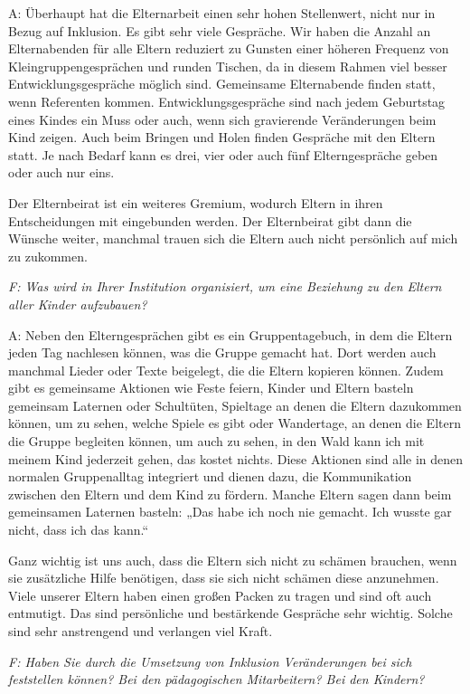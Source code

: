 \begin{linenumbers*}
A: Überhaupt hat die Elternarbeit einen sehr hohen Stellenwert, nicht nur in Bezug auf Inklusion. Es gibt sehr viele Gespräche. Wir haben die Anzahl an Elternabenden für alle Eltern reduziert zu Gunsten einer höheren Frequenz von Kleingruppengesprächen und runden Tischen, da in diesem Rahmen viel besser Entwicklungsgespräche möglich sind. Gemeinsame Elternabende finden statt, wenn Referenten kommen.
Entwicklungsgespräche sind nach jedem Geburtstag eines Kindes ein Muss oder auch, wenn sich gravierende Veränderungen beim Kind zeigen. Auch beim Bringen und Holen finden Gespräche mit den Eltern statt. Je nach Bedarf kann es drei, vier oder auch fünf Elterngespräche geben oder auch nur eins. 

Der Elternbeirat ist ein weiteres Gremium, wodurch Eltern in ihren Entscheidungen mit eingebunden werden. Der Elternbeirat gibt dann die Wünsche weiter, manchmal trauen sich die Eltern auch nicht persönlich auf mich zu zukommen. 

\emph{F: Was wird in Ihrer Institution organisiert, um eine Beziehung zu den Eltern aller Kinder aufzubauen?}

A: Neben den Elterngesprächen gibt es ein Gruppentagebuch, in dem die Eltern jeden Tag nachlesen können, was die Gruppe gemacht hat. Dort werden auch manchmal Lieder oder Texte beigelegt, die die Eltern kopieren können. Zudem gibt es gemeinsame Aktionen wie Feste feiern, Kinder und Eltern basteln gemeinsam Laternen oder Schultüten, Spieltage an denen die Eltern dazukommen können, um zu sehen, welche Spiele es gibt oder Wandertage, an denen die Eltern die Gruppe begleiten können, um auch zu sehen, in den Wald kann ich mit meinem Kind jederzeit gehen, das kostet nichts. Diese Aktionen sind alle in denen normalen Gruppenalltag integriert und dienen dazu, die Kommunikation zwischen den Eltern und dem Kind zu fördern. Manche Eltern sagen dann beim gemeinsamen Laternen basteln: „Das habe ich noch nie gemacht. Ich wusste gar nicht, dass ich das kann.“ 

Ganz wichtig ist uns auch, dass die Eltern sich nicht zu schämen brauchen, wenn sie zusätzliche Hilfe benötigen, dass sie sich nicht schämen diese anzunehmen. Viele unserer Eltern haben einen großen Packen zu tragen und sind oft auch entmutigt. Das sind persönliche und bestärkende Gespräche sehr wichtig. Solche sind sehr anstrengend und verlangen viel Kraft. 

\emph{F: Haben Sie durch die Umsetzung von Inklusion Veränderungen bei sich feststellen können? Bei den pädagogischen Mitarbeitern? Bei den Kindern?} 


\end{linenumbers*}
